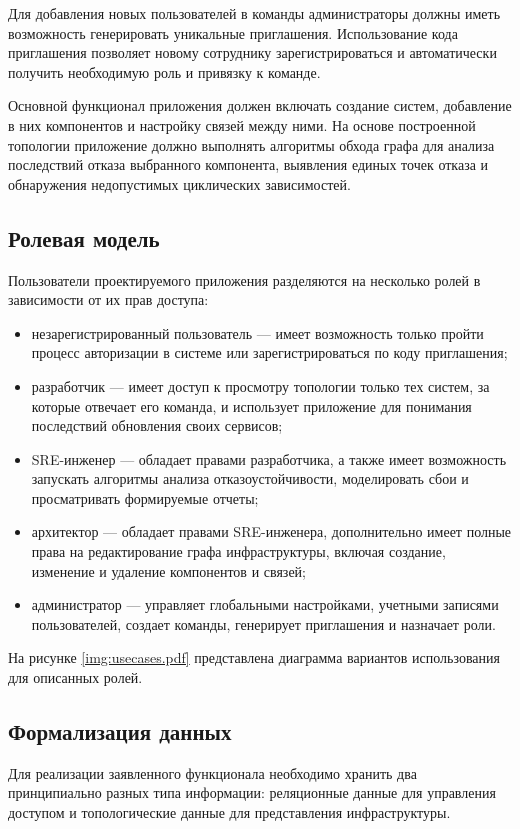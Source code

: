 Для добавления новых пользователей в команды администраторы должны иметь возможность
генерировать уникальные приглашения. Использование кода приглашения позволяет новому
сотруднику зарегистрироваться и автоматически получить необходимую роль и привязку к
команде.

Основной функционал приложения должен включать создание систем, добавление в них
компонентов и настройку связей между ними. На основе построенной топологии приложение
должно выполнять алгоритмы обхода графа для анализа последствий отказа выбранного
компонента, выявления единых точек отказа и обнаружения недопустимых циклических зависимостей.

\subsection{Ролевая модель}
Пользователи проектируемого приложения разделяются на несколько ролей в зависимости от их
прав доступа:
\begin{itemize}
    \item незарегистрированный пользователь --- имеет возможность только пройти процесс
        авторизации в системе или зарегистрироваться по коду приглашения;
    \item разработчик --- имеет доступ к просмотру топологии только тех систем, за
        которые отвечает его команда, и использует приложение для понимания последствий
        обновления своих сервисов;
    \item SRE-инженер --- обладает правами разработчика, а также имеет возможность
        запускать алгоритмы анализа отказоустойчивости, моделировать сбои и просматривать
        формируемые отчеты;
    \item архитектор --- обладает правами SRE-инженера, дополнительно имеет полные права
        на редактирование графа инфраструктуры, включая создание, изменение и удаление
        компонентов и связей;
    \item администратор --- управляет глобальными настройками, учетными записями
        пользователей, создает команды, генерирует приглашения и назначает роли.
\end{itemize}

На рисунке \ref{img:usecases.pdf} представлена диаграмма вариантов использования для описанных ролей.

\clearpage


\subsection{Формализация данных}
Для реализации заявленного функционала необходимо хранить два принципиально разных типа
информации: реляционные данные для управления доступом и топологические данные для
представления инфраструктуры.


